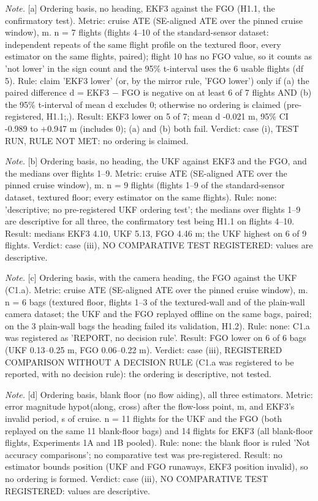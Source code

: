 \begin{table}[htbp]
\textit{Note.} [a] Ordering basis, no heading, EKF3 against the FGO (H1.1, the confirmatory test). Metric: cruise ATE (SE-aligned ATE over the pinned cruise window), m. n = 7 flights (flights 4--10 of the standard-sensor dataset: independent repeats of the same flight profile on the textured floor, every estimator on the same flights, paired); flight 10 has no FGO value, so it counts as 'not lower' in the sign count and the 95\% t-interval uses the 6 usable flights (df 5). Rule: claim 'EKF3 lower' (or, by the mirror rule, 'FGO lower') only if (a) the paired difference d = EKF3 $-$ FGO is negative on at least 6 of 7 flights AND (b) the 95\% t-interval of mean d excludes 0; otherwise no ordering is claimed (pre-registered, H1.1;,). Result: EKF3 lower on 5 of 7; mean d -0.021 m, 95\% CI -0.989 to +0.947 m (includes 0); (a) and (b) both fail. Verdict: case (i), TEST RUN, RULE NOT MET: no ordering is claimed.\par
\textit{Note.} [b] Ordering basis, no heading, the UKF against EKF3 and the FGO, and the medians over flights 1--9. Metric: cruise ATE (SE-aligned ATE over the pinned cruise window), m. n = 9 flights (flights 1--9 of the standard-sensor dataset, textured floor; every estimator on the same flights). Rule: none: 'descriptive; no pre-registered UKF ordering test'; the medians over flights 1--9 are descriptive for all three, the confirmatory test being H1.1 on flights 4--10. Result: medians EKF3 4.10, UKF 5.13, FGO 4.46 m; the UKF highest on 6 of 9 flights. Verdict: case (iii), NO COMPARATIVE TEST REGISTERED: values are descriptive.\par
\textit{Note.} [c] Ordering basis, with the camera heading, the FGO against the UKF (C1.a). Metric: cruise ATE (SE-aligned ATE over the pinned cruise window), m. n = 6 bags (textured floor, flights 1--3 of the textured-wall and of the plain-wall camera dataset; the UKF and the FGO replayed offline on the same bags, paired; on the 3 plain-wall bags the heading failed its validation, H1.2). Rule: none: C1.a was registered as 'REPORT, no decision rule'. Result: FGO lower on 6 of 6 bags (UKF 0.13--0.25 m, FGO 0.06--0.22 m). Verdict: case (iii), REGISTERED COMPARISON WITHOUT A DECISION RULE (C1.a was registered to be reported, with no decision rule): the ordering is descriptive, not tested.\par
\textit{Note.} [d] Ordering basis, blank floor (no flow aiding), all three estimators. Metric: error magnitude hypot(along, cross) after the flow-loss point, m, and EKF3's invalid period, s of cruise. n = 11 flights for the UKF and the FGO (both replayed on the same 11 blank-floor bags) and 14 flights for EKF3 (all blank-floor flights, Experiments 1A and 1B pooled). Rule: none: the blank floor is ruled 'Not accuracy comparisons'; no comparative test was pre-registered. Result: no estimator bounds position (UKF and FGO runaways, EKF3 position invalid), so no ordering is formed. Verdict: case (iii), NO COMPARATIVE TEST REGISTERED: values are descriptive.\par

\end{table}
